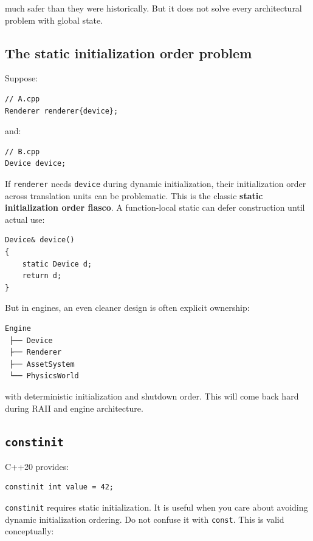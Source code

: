 much safer than they were historically. But it does not solve every architectural problem with global state.

\subsection{The static initialization order problem}\label{01-foundations-i-ch002-the-static-initialization-order-problem}

Suppose:

\begin{verbatim}
// A.cpp
Renderer renderer{device};
\end{verbatim}

and:

\begin{verbatim}
// B.cpp
Device device;
\end{verbatim}

If \texttt{renderer} needs \texttt{device} during dynamic initialization, their initialization order across translation units can be problematic. This is the classic \textbf{static initialization order fiasco}. A function-local static can defer construction until actual use:

\begin{verbatim}
Device& device()
{
    static Device d;
    return d;
}
\end{verbatim}

But in engines, an even cleaner design is often explicit ownership:

\begin{verbatim}
Engine
 ├── Device
 ├── Renderer
 ├── AssetSystem
 └── PhysicsWorld
\end{verbatim}

with deterministic initialization and shutdown order. This will come back hard during RAII and engine architecture.

\subsection{\texorpdfstring{\texttt{constinit}}{constinit}}\label{01-foundations-i-ch002-constinit}

C++20 provides:

\begin{verbatim}
constinit int value = 42;
\end{verbatim}

\texttt{constinit} requires static initialization. It is useful when you care about avoiding dynamic initialization ordering. Do not confuse it with \texttt{const}. This is valid conceptually:

